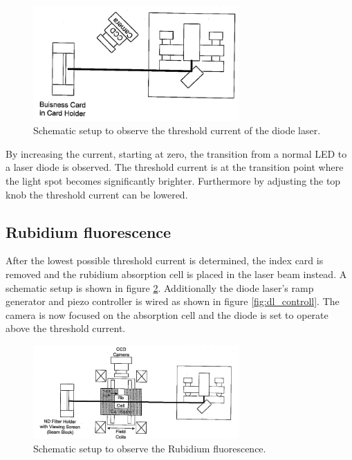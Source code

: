 \begin{figure}
  \centering
  \includegraphics[width=0.7\textwidth]{setup1.png}
  \caption{Schematic setup to observe the threshold current of the diode laser.\cite{V60}}
  \label{fig:setup1}
\end{figure}
By increasing the current, starting at zero, the transition from
a normal LED to a laser diode is observed.
The threshold current is at the
transition point where the light spot becomes significantly brighter.
Furthermore by adjusting the top knob the threshold current can be lowered.


\subsection{Rubidium fluorescence}
\label{subsec:RB_fluorescence}

After the lowest possible threshold current is determined, the
index card is removed and
the rubidium absorption cell
is placed in the laser beam instead.
A schematic setup is shown in figure \ref{fig:setup2}.
Additionally the diode laser's ramp generator and  piezo controller is wired as shown in figure \ref{fig:dl_controll}.
The camera is now
focused on the absorption cell and
the diode is set to operate above the threshold current.
\begin{figure}
  \centering
  \includegraphics[width=0.7\textwidth]{setup2.png}
  \caption{Schematic setup to observe the Rubidium fluorescence.\cite{V60}}
  \label{fig:setup2}
\end{figure}

